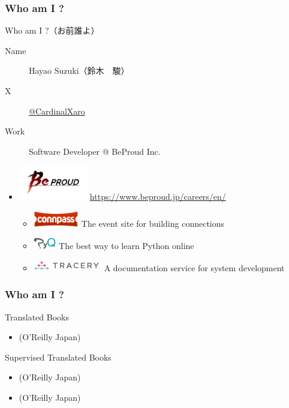 \documentclass[aspectratio=169,dvipdfmx,12pt,notheorems]{beamer}
\theoremstyle{definition}
\begin{document}
\begin{frame}\frametitle{Who am I ?}

\begin{block}{Who am I ?（お前誰よ）}
\begin{description}
\item[Name] Hayao Suzuki（鈴木　駿）
\item[ X] \href{https://twitter.com/CardinalXaro}{@CardinalXaro}
\item[Work] Software Developer @ BeProud Inc.
\end{description}
\end{block}

\begin{center}
\begin{itemize}
\item \includegraphics[width=3cm]{bplogo.png}  \url{https://www.beproud.jp/careers/en/}
\begin{itemize}
\item \includegraphics[width=2cm]{connpass_logo_1.png} The event site for building connections
\item \includegraphics[width=1cm]{pyq_logo_color.png} The best way to learn Python online
\item \includegraphics[width=3cm]{tracery.png} A documentation service for system development
\end{itemize}
\end{itemize}
\end{center}

\end{frame}

\begin{frame}\frametitle{Who am I ?}

\begin{block}{Translated Books}
\begin{itemize}
\item {}(O'Reilly Japan) 
\end{itemize}
\end{block}

\begin{block}{Supervised Translated Books}
\begin{itemize}
\item {}(O'Reilly Japan)
\item {}(O'Reilly Japan)
\end{itemize}
\end{block}

\end{frame}
\end{document}
